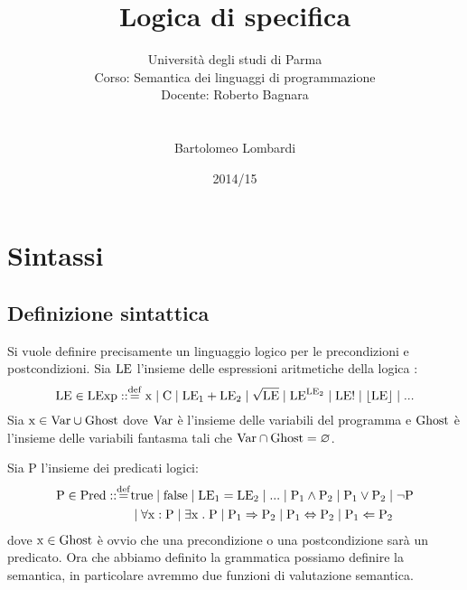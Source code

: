 \documentclass[a4paper, 12pt, oneside,fleqn]{book}
\begin{document}
\title{Logica di specifica}
\author{Università degli studi di Parma \\
Corso: Semantica dei linguaggi di programmazione \\
Docente: Roberto Bagnara \\\\\\
Bartolomeo Lombardi
}
\date{2014/15}
\maketitle
\tableofcontents

\newpage
\chapter{Sintassi}
\section{Definizione sintattica}
\theoremstyle{definition}
Si vuole definire precisamente un linguaggio logico per le precondizioni e postcondizioni. Sia $\mathrm{LE}$ l'insieme delle espressioni aritmetiche della logica :
$$\LE \in \LExp \itc\itc\defeq \idx \mid \C \mid \LE{_1} + \LE{_2} \mid \sqrt{\LE} \mid \LE^{\LE{_2}} \mid \LE! \mid \lfloor \LE \rfloor \mid ...$$
Sia $\mathrm{x}\in\mathrm{Var}\cup\mathrm{Ghost}$ dove $\mathrm{Var}$ è l'insieme delle variabili del programma e $\mathrm{Ghost}$ è l'insieme delle variabili fantasma tali che $\mathrm{Var}\cap\mathrm{Ghost} = \varnothing$.

Sia P l'insieme dei predicati logici:
\begin{align*}
\p \in \Pred \itc\itc\defeq &\true \mid\false\mid\LE{_1} = \LE{_2}\mid ...\mid \p{_1} \wedge \p{_2} \mid \p{_1} \vee \p{_2} \mid \neg \p\\
&\mid \forall\idx\itc \p\mid \exists\idx\st \p\mid \p{_1} \Rightarrow \p{_2} \mid \p{_1} \Leftrightarrow \p{_2} \mid \p{_1} \Leftarrow \p{_2}
\end{align*}
dove $\mathrm{x}\in\mathrm{Ghost}$ è ovvio che una precondizione o una postcondizione sarà un predicato. Ora che abbiamo definito la grammatica possiamo definire la semantica, in particolare avremmo due funzioni di valutazione semantica.
\end{document}
